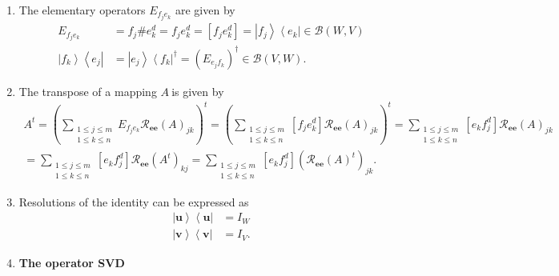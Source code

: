 \documentclass[aps,preprint]{revtex4}%
\begin{document}
\begin{enumerate}
\item The elementary operators $E_{f_{j}e_{k}}$ are given by
\begin{align*}
E_{f_{j}e_{k}}  &  =f_{j}\#e_{k}^{d}=f_{j}e_{k}^{d}=\left[  f_{j}e_{k}%
^{d}\right]  =\left\vert f_{j}\right\rangle \left\langle e_{k}\right\vert
\in\mathcal{B}\left(  W,V\right) \\
\left\vert f_{k}\right\rangle \left\langle e_{j}\right\vert  &  =\left\vert
e_{j}\right\rangle \left\langle f_{k}\right\vert ^{\dagger}=\left(
E_{e_{j}f_{k}}\right)  ^{\dagger}\in\mathcal{B}\left(  V,W\right)  .
\end{align*}


\item The transpose of a mapping $A\ $is given by
\begin{gather}
A^{t}=\left(  \sum_{\substack{1\leq j\leq m\\1\leq k\leq n}}E_{f_{j}e_{k}%
}\mathcal{R}_{\boldsymbol{ee}}\left(  A\right)  _{jk}\right)  ^{t}=\left(
\sum_{\substack{1\leq j\leq m\\1\leq k\leq n}}\left[  f_{j}e_{k}^{d}\right]
\mathcal{R}_{\boldsymbol{ee}}\left(  A\right)  _{jk}\right)  ^{t}%
=\sum_{\substack{1\leq j\leq m\\1\leq k\leq n}}\left[  e_{k}f_{j}^{d}\right]
\mathcal{R}_{\boldsymbol{ee}}\left(  A\right)  _{jk}\\
=\sum_{\substack{1\leq j\leq m\\1\leq k\leq n}}\left[  e_{k}f_{j}^{d}\right]
\mathcal{R}_{\boldsymbol{ee}}\left(  A^{t}\right)  _{kj}=\sum_{\substack{1\leq
j\leq m\\1\leq k\leq n}}\left[  e_{k}f_{j}^{d}\right]  \left(  \mathcal{R}%
_{\boldsymbol{ee}}\left(  A\right)  ^{t}\right)  _{jk}.
\end{gather}


\item Resolutions of the identity can be expressed as
\begin{align*}
\left\vert \mathbf{u}\right\rangle \left\langle \mathbf{u}\right\vert  &
=I_{W}\\
\left\vert \mathbf{v}\right\rangle \left\langle \mathbf{v}\right\vert  &
=I_{V}.
\end{align*}


\item \textbf{The operator SVD \label{operator SVD}}


\end{enumerate}
\end{document}
